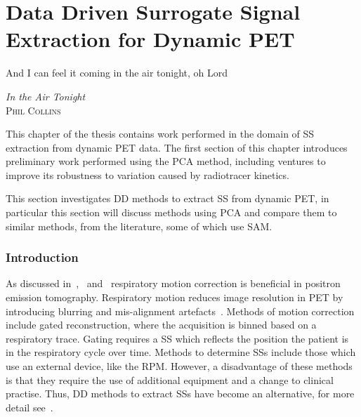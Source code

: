 \chapter{Data Driven Surrogate Signal Extraction for Dynamic PET} \label{sec:data_driven_surrogate_signal_extraction_results}
    \vspace*{\fill}
    \setlength{\epigraphwidth}{0.5\linewidth}
    \renewcommand{\epigraphflush}{flushright}
    \renewcommand{\epigraphsize}{\footnotesize}
    \epigraph{And I can feel it coming in the air tonight, oh Lord}%
              {\textit{In the Air Tonight}\\ \textsc{Phil Collins}}
    
    \newpage
    
        This chapter of the thesis contains work performed in the domain of \gls{SS} extraction from dynamic \gls{PET} data. The first section of this chapter introduces preliminary work performed using the \gls{PCA} method, including ventures to improve its robustness to variation caused by radiotracer kinetics.
    
        This section investigates \gls{DD} methods to extract \gls{SS} from dynamic \gls{PET}, in particular this section will discuss methods using \gls{PCA} and compare them to similar methods, from the literature, some of which use \gls{SAM}.
        
        \subsection{Introduction} \label{sec:pca_data_driven_surrogate_signal_extraction_methods_for_dynamic_pet_introduction}
            As discussed in~,~ and~ respiratory motion correction is beneficial in positron emission tomography. Respiratory motion reduces image resolution in \gls{PET} by introducing blurring and mis-alignment artefacts~\parencite{Nehmeh2008a}. Methods of motion correction include gated reconstruction, where the acquisition is binned based on a respiratory trace. Gating requires a \gls{SS} which reflects the position the patient is in the respiratory cycle over time. Methods to determine \glspl{SS} include those which use an external device, like the \gls{RPM}. However, a disadvantage of these methods is that they require the use of additional equipment and a change to clinical practise. Thus, \gls{DD} methods to extract \glspl{SS} have become an alternative, for more detail see~. 
            
